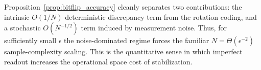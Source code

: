 \begin{remark}
Proposition~\ref{prop:bitflip_accuracy} cleanly separates two contributions:
the intrinsic $O(1/N)$ deterministic discrepancy term from the rotation coding, and a stochastic $O(N^{-1/2})$ term induced by measurement noise.
Thus, for sufficiently small $\epsilon$ the noise-dominated regime forces the familiar $N=\Theta(\epsilon^{-2})$ sample-complexity scaling.
This is the quantitative sense in which imperfect readout increases the operational space cost of stabilization.
\end{remark}
